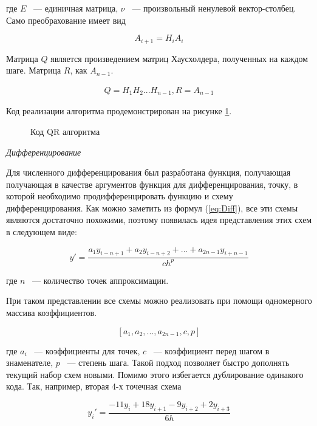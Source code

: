 где $E$ ~--- единичная матрица, $\nu$ ~--- произвольный ненулевой вектор-столбец.
Само преобрахование имеет вид

\begin{equation}
    A_{i + 1} = H_iA_i
    \label{eq:QRAlgo}
\end{equation}

Матрица $Q$ является произведением матриц Хаусхолдера, полученных на каждом шаге. Матрица $R$, как $A_{n-1}$.

\begin{equation}
    \begin{gathered}
        Q = H_1H_2...H_{n-1}, R = A_{n - 1}
    \end{gathered}
    \label{eq:QFind}
\end{equation}

Код реализации алгоритма продемонстрирован на рисунке \ref{src:QR}.

\begin{figure}
    
    \caption{Код QR алгоритма}
    \label{src:QR}
\end{figure}

\textit{Дифференцирование}

Для численного дифференцирования был разработана функция, получающая  получающая в качестве аргументов функция для дифференцирования,
точку, в которой необходимо продифференцировать функцию и схему дифференцирования. Как можно заметить из формул (\ref{eq:Diff}), все
эти схемы являются достаточно похожими, поэтому появилась идея представления этих схем в следующем виде:

\begin{equation}
    y' = \frac{a_1y_{i-n+1} + a_2y_{i-n+2} + ... + a_{2n-1}y_{i+n-1}}{ch^p}
    \label{eq:DiffCommon}
\end{equation}

где $n$ ~--- количество точек аппроксимации.

При таком представлении все схемы можно реализовать при помощи одномерного массива коэффициентов.

$$
[a_1, a_2, ..., a_{2n - 1}, c, p]
$$

где $a_i$ ~--- коэффициенты для точек, $c$ ~--- коэффициент перед шагом в знаменателе, $p$ ~--- степень шага. Такой подход позволяет
быстро дополнять текущий набор схем новыми. Помимо этого избегается дублирование одинакого кода.
Так, например, вторая 4-х точечная схема 

\begin{equation}
    y_i' = \frac{-11y_{i} + 18y_{i+1} - 9y_{i+2} + 2y_{i+3}}{6h}
    \label{eq:Diff1-4}
\end{equation}

